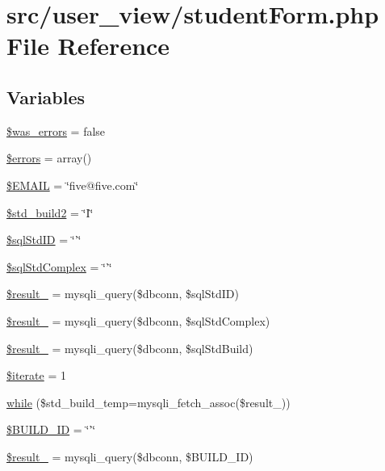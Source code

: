 \hypertarget{studentForm_8php}{\section{src/user\-\_\-view/student\-Form.php \-File \-Reference}
\label{studentForm_8php}
}
\subsection*{\-Variables}
\begin{DoxyCompactItemize}
\item 
\hyperlink{studentForm_8php_ae8f928f475945454d3cfd1d4214c09f2}{\$was\-\_\-errors} = false
\item 
\hyperlink{studentForm_8php_ab24faf4aa647cdcee494fc48524ad4ff}{\$errors} = array()
\item 
\hyperlink{studentForm_8php_a47bae00d656c37ccabf3f0a6e8ca39ec}{\$\-E\-M\-A\-I\-L} = \char`\"{}five@five.\-com\char`\"{}
\item 
\hyperlink{studentForm_8php_a2a52d5de3c70db963bd63f3cc0bdb09e}{\$std\-\_\-build2} = \char`\"{}\-I\char`\"{}
\item 
\hyperlink{studentForm_8php_a46b1581b0b49ddd7427714321fc5a641}{\$sql\-Std\-I\-D} = \char`\"{}'\char`\"{}
\item 
\hyperlink{studentForm_8php_adb86f6e2c816e38e375c8c73aab83c39}{\$sql\-Std\-Complex} = \char`\"{}'\char`\"{}
\item 
\hyperlink{studentForm_8php_af4ecd7d330a614a9ff022fcccfd8df8a}{\$result\-\_} = mysqli\-\_\-query(\$dbconn, \$sql\-Std\-I\-D)
\item 
\hyperlink{studentForm_8php_a07f852a7360d1ebc1bf4cd3656067b66}{\$result\-\_} = mysqli\-\_\-query(\$dbconn, \$sql\-Std\-Complex)
\item 
\hyperlink{studentForm_8php_a357d2b02bfc3b7772c72f22aa687fd14}{\$result\-\_} = mysqli\-\_\-query(\$dbconn, \$sql\-Std\-Build)
\item 
\hyperlink{studentForm_8php_a4747dd5778098fd12613d61e564cf58e}{\$iterate} = 1
\item 
\hyperlink{studentForm_8php_abeb5d2366a9870820ffb1e260d040d8d}{while} (\$std\-\_\-build\-\_\-temp=mysqli\-\_\-fetch\-\_\-assoc(\$result\-\_))
\item 
\hyperlink{studentForm_8php_a4003cf8da4c94911cef7e69853cbac42}{\$\-B\-U\-I\-L\-D\-\_\-\-I\-D} = \char`\"{}'\char`\"{}
\item 
\hyperlink{studentForm_8php_a0b3f63d6f969a6ad92963ceae90afab9}{\$result\-\_} = mysqli\-\_\-query(\$dbconn, \$\-B\-U\-I\-L\-D\-\_\-\-I\-D)
\end{DoxyCompactItemize}


